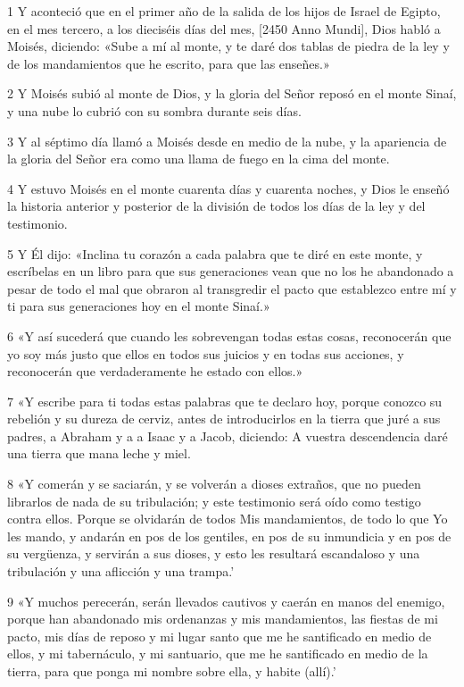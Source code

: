 \par 1 Y aconteció que en el primer año de la salida de los hijos de Israel de Egipto, en el mes tercero, a los dieciséis días del mes, [2450 Anno Mundi], Dios habló a Moisés, diciendo: «Sube a mí al monte, y te daré dos tablas de piedra de la ley y de los mandamientos que he escrito, para que las enseñes.»
\par 2 Y Moisés subió al monte de Dios, y la gloria del Señor reposó en el monte Sinaí, y una nube lo cubrió con su sombra durante seis días.
\par 3 Y al séptimo día llamó a Moisés desde en medio de la nube, y la apariencia de la gloria del Señor era como una llama de fuego en la cima del monte.
\par 4 Y estuvo Moisés en el monte cuarenta días y cuarenta noches, y Dios le enseñó la historia anterior y posterior de la división de todos los días de la ley y del testimonio.
\par 5 Y Él dijo: «Inclina tu corazón a cada palabra que te diré en este monte, y escríbelas en un libro para que sus generaciones vean que no los he abandonado a pesar de todo el mal que obraron al transgredir el pacto que establezco entre mí y ti para sus generaciones hoy en el monte Sinaí.»
\par 6 «Y así sucederá que cuando les sobrevengan todas estas cosas, reconocerán que yo soy más justo que ellos en todos sus juicios y en todas sus acciones, y reconocerán que verdaderamente he estado con ellos.»
\par 7 «Y escribe para ti todas estas palabras que te declaro hoy, porque conozco su rebelión y su dureza de cerviz, antes de introducirlos en la tierra que juré a sus padres, a Abraham y a a Isaac y a Jacob, diciendo: A vuestra descendencia daré una tierra que mana leche y miel.
\par 8 «Y comerán y se saciarán, y se volverán a dioses extraños, que no pueden librarlos de nada de su tribulación; y este testimonio será oído como testigo contra ellos. Porque se olvidarán de todos Mis mandamientos, de todo lo que Yo les mando, y andarán en pos de los gentiles, en pos de su inmundicia y en pos de su vergüenza, y servirán a sus dioses, y esto les resultará escandaloso y una tribulación y una aflicción y una trampa.'
\par 9 «Y muchos perecerán, serán llevados cautivos y caerán en manos del enemigo, porque han abandonado mis ordenanzas y mis mandamientos, las fiestas de mi pacto, mis días de reposo y mi lugar santo que me he santificado en medio de ellos, y mi tabernáculo, y mi santuario, que me he santificado en medio de la tierra, para que ponga mi nombre sobre ella, y habite (allí).'
